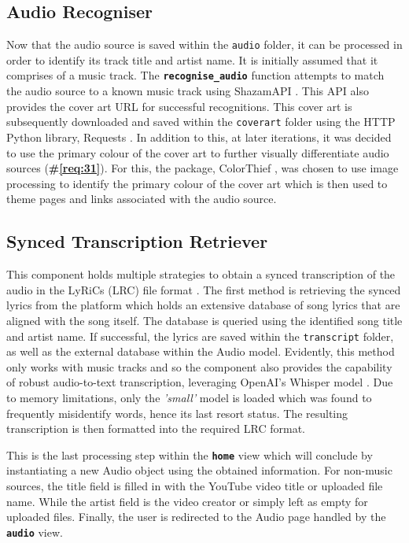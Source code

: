 \documentclass{l4proj}
\begin{document}
\subsection{Audio Recogniser}
Now that the audio source is saved within the \lstinline|audio| folder, it can be processed in order to identify its track title and artist name. It is initially assumed that it comprises of a music track. The \textbf{\lstinline|recognise_audio|} function attempts to match the audio source to a known music track using ShazamAPI \citep{shazamapi}. This API also provides the cover art URL for successful recognitions. This cover art is subsequently downloaded and saved within the \lstinline|coverart| folder using the HTTP Python library, Requests \citep{requests}. In addition to this, at later iterations, it was decided to use the primary colour of the cover art to further visually differentiate audio sources (\textbf{\#\ref{req:31}}). For this, the package, ColorThief \citep{colorthief}, was chosen to use image processing to identify the primary colour of the cover art which is then used to theme pages and links associated with the audio source.


\subsection{Synced Transcription Retriever}
This component holds multiple strategies to obtain a synced transcription of the audio in the LyRiCs (LRC) file format \citep{lrc}. The first method is retrieving the synced lyrics from the \cite{musixmatch} platform which holds an extensive database of song lyrics that are aligned with the song itself. The database is queried using the identified song title and artist name. If successful, the lyrics are saved within the \lstinline|transcript| folder, as well as the external database within the Audio model. Evidently, this method only works with music tracks and so the component also provides the capability of robust audio-to-text transcription, leveraging OpenAI's Whisper model \citep{whisper}. Due to memory limitations, only the \emph{'small'} model is loaded which was found to frequently misidentify words, hence its last resort status.  The resulting transcription is then formatted into the required LRC format.

This is the last processing step within the \textbf{\lstinline|home|} view which will conclude by instantiating a new Audio object using the obtained information. For non-music sources, the title field is filled in with the YouTube video title or uploaded file name. While the artist field is the video creator or simply left as empty for uploaded files. Finally, the user is redirected to the Audio page handled by the \textbf{\lstinline|audio|} view.
\end{document}
